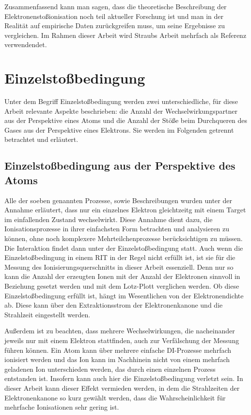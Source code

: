 Zusammenfassend kann man sagen, dass die theoretische Beschreibung der Elektronenstoßionisation noch teil aktueller Forschung ist und man in der Realität auf empirische Daten zurückgreifen muss, um seine Ergebnisse zu vergleichen. Im Rahmen dieser Arbeit wird Straubs Arbeit \cite{Straub} mehrfach als Referenz verwendendet. 

\section{Einzelstoßbedingung}
\label{chap:Einzelstoß}
Unter dem Begriff Einzelstoßbedingung werden zwei unterschiedliche, für diese Arbeit relevante Aspekte beschrieben: die Anzahl der Wechselwirkungspartner aus der Perspektive eines Atoms und die Anzahl der Stöße beim Durchqueren des Gases aus der Perspektive eines Elektrons. Sie werden im Folgenden getrennt betrachtet und erläutert.

\subsection{Einzelstoßbedingung aus der Perspektive des Atoms}
Alle der soeben genannten Prozesse, sowie Beschreibungen wurden unter der Annahme erläutert, dass nur ein einzelnes Elektron gleichtzeitg mit einem Target im einfallenden Zustand wechselwirkt. Diese Annahme dient dazu, die Ionisationsprozesse in ihrer einfachsten Form betrachten und analysieren zu können, ohne noch komplexere Mehrteilchenprozesse berücksichtigen zu müssen. Die Interaktion findet dann unter der Einzelstoßbedingung statt. Auch wenn die Einzelstoßbedingung in einem RIT in der Regel nicht erfüllt ist, ist sie für die Messung des Ionisierungsquerschnitts in dieser Arbeit essenziell. Denn nur so kann die Anzahl der erzeugten Ionen mit der Anzahl der Elektronen sinnvoll in Beziehung gesetzt werden und mit dem Lotz-Plott verglichen werden. Ob diese Einzelstoßbedingung erfüllt ist, hängt im Wesentlichen von der Elektronendichte ab. Diese kann über den Extraktionsstrom der Elektronenkanone und die Strahlzeit eingestellt werden.

Außerdem ist zu beachten, dass mehrere Wechselwirkungen, die nacheinander jeweils nur mit einem Elektron stattfinden, auch zur Verfälschung der Messung führen können. Ein Atom kann über mehrere einfache DI-Prozesse mehrfach ionisiert werden und das Ion kann im Nachhinein nicht von einem mehrfach geladenen Ion unterschieden werden, das durch einen einzelnen Prozess entstanden ist. Insofern kann auch hier die Einzelstoßbedingung verletzt sein. In dieser Arbeit kann dieser Effekt vermieden werden, in dem die Strahlzeiten der Elektronenkanone so kurz gewählt werden, dass die Wahrscheinlichkeit für mehrfache Ionisationen sehr gering ist.

